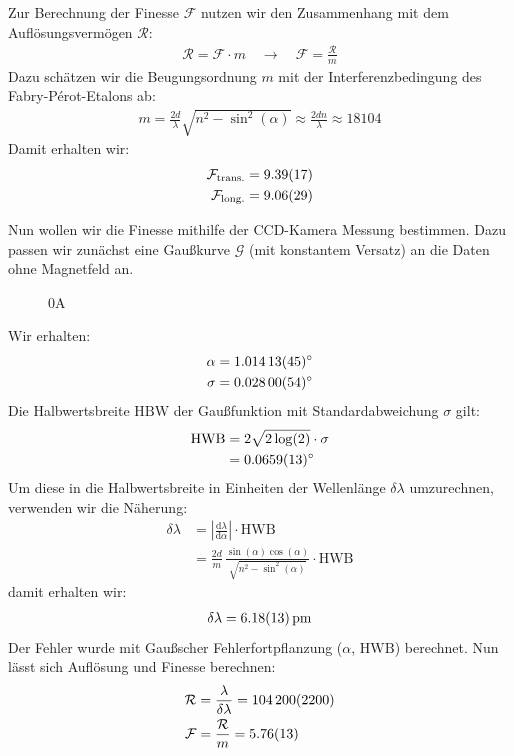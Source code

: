 \documentclass[11pt, a4paper]{article}
\begin{document}
Zur Berechnung der Finesse $\mathcal{F}$ nutzen wir den Zusammenhang mit dem Auflösungsvermögen $\mathcal{R}$:
\begin{align}
	\mathcal{R} = \mathcal{F} \cdot m \quad \rightarrow \quad \mathcal{F} = \frac{\mathcal{R}}{m}
\end{align}
Dazu schätzen wir die Beugungsordnung $m$ mit der Interferenzbedingung des Fabry-Pérot-Etalons ab:
\begin{align}
	m = \frac{2 d}{\lambda} \sqrt{n^2 - \sin^2(\alpha)} \approx \frac{2 d n}{\lambda} \approx 18104
\end{align}
Damit erhalten wir:
\begin{align}
	\mathcal{F}_\mathrm{trans.} = \num{9.39 +- 0.17} \\
	\mathcal{F}_\mathrm{long.} = \num{9.06  +- 0.29}
\end{align}

Nun wollen wir die Finesse mithilfe der CCD-Kamera Messung bestimmen.
Dazu passen wir zunächst eine Gaußkurve $\mathcal{G}$ (mit konstantem Versatz) an die Daten ohne Magnetfeld an.
\begin{figure}[h]
	\centering
	
	\caption{0A}
	\label{fig:gauss0}
\end{figure}
Wir erhalten:
\begin{align}
	\alpha &= \SI{1.01413 +- 0.00045}{\degree}\\
	\sigma &= \SI{0.02800 +- 0.00054}{\degree}
\end{align}
Die Halbwertsbreite $\mathrm{HBW}$ der Gaußfunktion mit Standardabweichung $\sigma$ gilt:
\begin{align}
\mathrm{HWB} &= 2 \sqrt{2\log(2)} \cdot \sigma\\
 &= \SI{0.0659 +- 0.0013}{\degree}
\end{align}
Um diese in die Halbwertsbreite in Einheiten der Wellenlänge $\delta \lambda$ umzurechnen, verwenden wir die Näherung:
\begin{align}
	\delta \lambda &= \left| \frac{\mathrm{d}\lambda}{\mathrm{d}\alpha} \right| \cdot \mathrm{HWB} \\
	 &= \frac{2d}{m} \, \frac{\sin(\alpha) \cos(\alpha)}{\sqrt{n^2-\sin^2(\alpha)}} \cdot \mathrm{HWB}
\end{align}
damit erhalten wir:
\begin{align}
	\delta \lambda = \SI{6.18 +- 0.13}{\pico\metre}
\end{align}
Der Fehler wurde mit Gaußscher Fehlerfortpflanzung ($\alpha$, $\mathrm{HWB}$) berechnet.
Nun lässt sich Auflösung und Finesse berechnen:
\begin{align}
	\mathcal{R} &= \frac{\lambda}{\delta \lambda} = \num{104200 +- 2200} \\
	\mathcal{F} &= \frac{\mathcal{R}}{m} = \num{5.76 +- 0.13}
\end{align}
\end{document}

